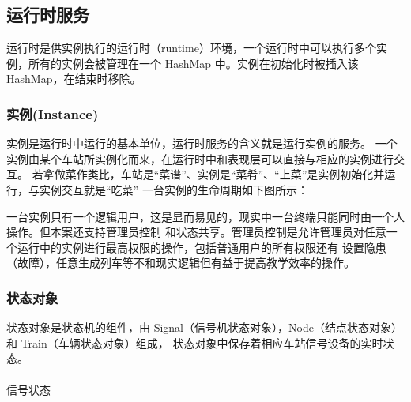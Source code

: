\subsection{运行时服务}
运行时是供实例执行的运行时（runtime）环境，一个运行时中可以执行多个实例，所有的实例会被管理在一个
HashMap 中。实例在初始化时被插入该HashMap，在结束时移除。

\subsubsection{实例(Instance)}
实例是运行时中运行的基本单位，运行时服务的含义就是运行实例的服务。
一个实例由某个车站所实例化而来，在运行时中和表现层可以直接与相应的实例进行交互。
若拿做菜作类比，车站是“菜谱”、实例是“菜肴”、“上菜”是实例初始化并运行，与实例交互就是“吃菜”
一台实例的生命周期如下图所示：

一台实例只有一个逻辑用户，这是显而易见的，现实中一台终端只能同时由一个人操作。但本案还支持管理员控制
和状态共享。管理员控制是允许管理员对任意一个运行中的实例进行最高权限的操作，包括普通用户的所有权限还有
设置隐患（故障），任意生成列车等不和现实逻辑但有益于提高教学效率的操作。

\subsubsection{状态对象}
状态对象是状态机的组件，由 Signal（信号机状态对象），Node（结点状态对象） 和 Train（车辆状态对象）组成，
状态对象中保存着相应车站信号设备的实时状态。

\paragraph{}信号状态

